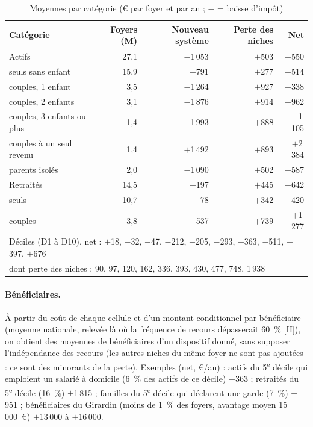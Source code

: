\begin{table}[h]\centering\footnotesize
\caption{Moyennes par catégorie (€ par foyer et par an ; $-$ = baisse d'impôt)}\label{tab:ircsg4_moy}
\begin{tabular}{lrrrr}\hline
Catégorie & Foyers (M) & Nouveau système & Perte des niches & Net \\ \hline
Actifs & 27{,}1 & $-$1\,053 & $+$503 & $-$550 \\
\quad seuls sans enfant & 15{,}9 & $-$791 & $+$277 & $-$514 \\
\quad couples, 1 enfant & 3{,}5 & $-$1\,264 & $+$927 & $-$338 \\
\quad couples, 2 enfants & 3{,}1 & $-$1\,876 & $+$914 & $-$962 \\
\quad couples, 3 enfants ou plus & 1{,}4 & $-$1\,993 & $+$888 & $-$1\,105 \\
\quad couples à un seul revenu & 1{,}4 & $+$1\,492 & $+$893 & $+$2\,384 \\
\quad parents isolés & 2{,}0 & $-$1\,090 & $+$502 & $-$587 \\
Retraités & 14{,}5 & $+$197 & $+$445 & $+$642 \\
\quad seuls & 10{,}7 & $+$78 & $+$342 & $+$420 \\
\quad couples & 3{,}8 & $+$537 & $+$739 & $+$1\,277 \\ \hline
\multicolumn{5}{l}{Déciles (D1 à D10), net : $+$18, $-$32, $-$47, $-$212, $-$205, $-$293, $-$363, $-$511, $-$397, $+$676} \\
\multicolumn{5}{l}{\quad dont perte des niches : 90, 97, 120, 162, 336, 393, 430, 477, 748, 1\,938} \\ \hline
\end{tabular}
\end{table}

\paragraph{Bénéficiaires.} À partir du coût de chaque cellule et d'un montant conditionnel par bénéficiaire (moyenne nationale, relevée là où la fréquence de recours dépasserait 60~\% [H]), on obtient des moyennes de bénéficiaires d'un dispositif donné, sans supposer l'indépendance des recours (les autres niches du même foyer ne sont pas ajoutées : ce sont des minorants de la perte). Exemples (net, €/an) : actifs du 5\textsuperscript{e} décile qui emploient un salarié à domicile (6~\% des actifs de ce décile) $+$363 ; retraités du 5\textsuperscript{e} décile (16~\%) $+$1\,815 ; familles du 5\textsuperscript{e} décile qui déclarent une garde (7~\%) $-$951 ; bénéficiaires du Girardin (moins de 1~\% des foyers, avantage moyen 15\,000~€) $+$13\,000 à $+$16\,000.

